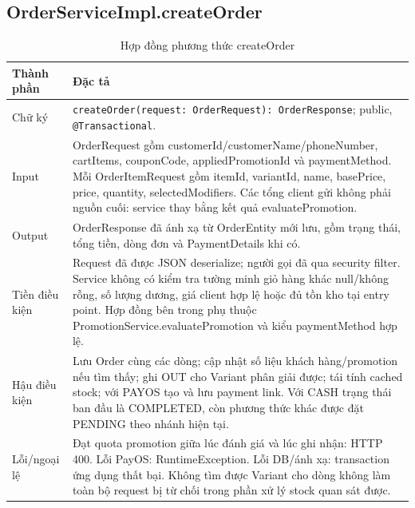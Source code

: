 \documentclass[12pt,a4paper,oneside]{report}
\begin{document}
\subsection{OrderServiceImpl.createOrder}
\begin{table}[htbp]
\centering\small
\caption{Hợp đồng phương thức createOrder}
\begin{tabularx}{\textwidth}{@{}p{3.1cm}Y@{}}\toprule
Thành phần & Đặc tả\\\midrule
Chữ ký & \texttt{createOrder(request: OrderRequest): OrderResponse}; public, \texttt{@Transactional}.\\
Input & OrderRequest gồm customerId/customerName/phoneNumber, cartItems, couponCode, appliedPromotionId và paymentMethod. Mỗi OrderItemRequest gồm itemId, variantId, name, basePrice, price, quantity, selectedModifiers. Các tổng client gửi không phải nguồn cuối: service thay bằng kết quả evaluatePromotion.\\
Output & OrderResponse đã ánh xạ từ OrderEntity mới lưu, gồm trạng thái, tổng tiền, dòng đơn và PaymentDetails khi có.\\
Tiền điều kiện & Request đã được JSON deserialize; người gọi đã qua security filter. Service không có kiểm tra tường minh giỏ hàng khác null/không rỗng, số lượng dương, giá client hợp lệ hoặc đủ tồn kho tại entry point. Hợp đồng bên trong phụ thuộc PromotionService.evaluatePromotion và kiểu paymentMethod hợp lệ.\\
Hậu điều kiện & Lưu Order cùng các dòng; cập nhật số liệu khách hàng/promotion nếu tìm thấy; ghi OUT cho Variant phân giải được; tái tính cached stock; với PAYOS tạo và lưu payment link. Với CASH trạng thái ban đầu là COMPLETED, còn phương thức khác được đặt PENDING theo nhánh hiện tại.\\
Lỗi/ngoại lệ & Đạt quota promotion giữa lúc đánh giá và lúc ghi nhận: HTTP 400. Lỗi PayOS: RuntimeException. Lỗi DB/ánh xạ: transaction ứng dụng thất bại. Không tìm được Variant cho dòng không làm toàn bộ request bị từ chối trong phần xử lý stock quan sát được.\\
\bottomrule\end{tabularx}
\end{table}
\end{document}
